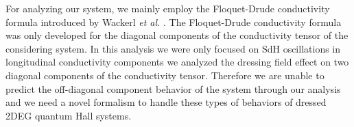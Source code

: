 \documentclass{article}
\begin{document}
For analyzing our system, we mainly employ the Floquet-Drude conductivity formula introduced by Wackerl \textit{et al.} \cite{wackerl20}. The Floquet-Drude conductivity formula was only developed for the diagonal components of the conductivity tensor of the considering system. In this analysis we were only focused on SdH oscillations in longitudinal conductivity components we analyzed the dressing field effect on two diagonal components of the conductivity tensor. Therefore we are unable to predict the off-diagonal component behavior of the system through our analysis and we need a novel formalism to handle these types of behaviors of dressed 2DEG quantum Hall systems.
%
%
\end{document}
